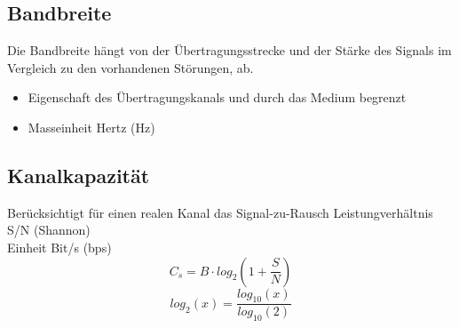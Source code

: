 \subsection{Bandbreite}{
    Die Bandbreite hängt von der Übertragungsstrecke und der Stärke des Signals im
    Vergleich zu den vorhandenen Störungen, ab.
    \begin{itemize}[noitemsep]
        \item Eigenschaft des Übertragungskanals und durch das Medium begrenzt
        \item Masseinheit Hertz (Hz)
    \end{itemize}
}

\subsection{Kanalkapazität}{
    Berücksichtigt für einen realen Kanal das Signal-zu-Rausch Leistungverhältnis S/N (Shannon)
    \\ Einheit Bit/s (bps)
    $$ C_s = B \cdot log_2(1 + \frac{S}{N})$$
    $$ log_2(x) = \frac{log_{10}(x)}{log_{10}(2)} $$
}
